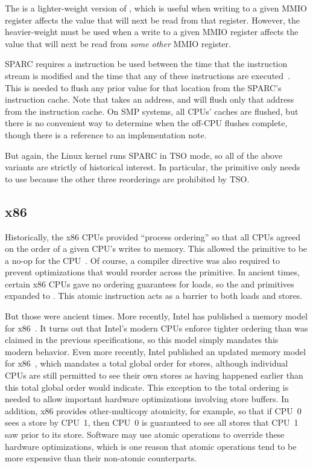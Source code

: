 The  is a lighter-weight version of
, which is useful when writing to a given MMIO register
affects the value that will next be read from that register.
However, the heavier-weight  must be used when
a write to a given MMIO register affects the value that will next be
read from {\em some other} MMIO register.

SPARC requires a  instruction be used between the time that
the instruction stream is modified and the time that any of these
instructions are executed~\cite{SPARC94}.
This is needed to flush any prior value for that location from
the SPARC's instruction cache.
Note that  takes an address, and will flush only that address
from the instruction cache.
On SMP systems, all CPUs' caches are flushed, but there is no
convenient way to determine when the off-CPU flushes complete,
though there is a reference to an implementation note.

But again, the Linux kernel runs SPARC in TSO mode, so
all of the above  variants are strictly of historical
interest.
In particular, the  primitive only needs to use 
because the other three reorderings are prohibited by TSO\@.

\subsection{x86}

Historically, the x86 CPUs provided ``process ordering'' so that all CPUs
agreed on the order of a given CPU's writes to memory.
This allowed the 
primitive to be a no-op for the CPU~\cite{IntelXeonV3-96a}.
Of course, a compiler directive was also required to prevent optimizations
that would reorder across the  primitive.
In ancient times, certain x86 CPUs gave no ordering guarantees for loads, so
the  and  primitives expanded to .
This atomic instruction acts as a barrier to both loads and stores.

But those were ancient times.
More recently, Intel has published a memory model for
x86~\cite{Intelx86MemoryOrdering2007}.
It turns out that Intel's modern CPUs enforce tighter ordering than was
claimed in the previous specifications, so this model simply mandates
this modern behavior.
Even more recently, Intel published an updated memory model for
x86~\cite[Section 8.2]{Intel64IA32v3A2011}, which mandates a total global order
for stores, although individual CPUs are still permitted to see their
own stores as having happened earlier than this total global order
would indicate.
This exception to the total ordering is needed to allow important
hardware optimizations involving store buffers.
In addition, x86 provides other-multicopy atomicity, for example,
so that if CPU~0 sees a store by CPU~1, then CPU~0 is guaranteed to see
all stores that CPU~1 saw prior to its store.
Software may use atomic operations to override these hardware optimizations,
which is one reason that atomic operations tend to be more expensive
than their non-atomic counterparts.

